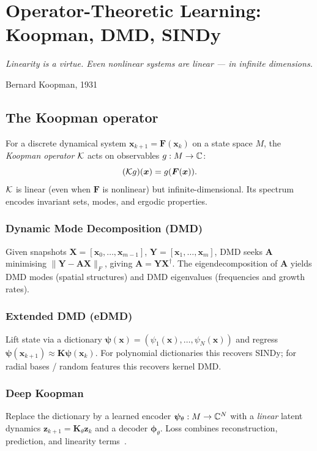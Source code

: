\chapter{Operator-Theoretic Learning: Koopman, DMD, SINDy}
\label{ch:operator-theoretic}

\epigraph{\itshape Linearity is a virtue. Even nonlinear systems are
linear --- in infinite dimensions.}{Bernard Koopman, 1931}

\section{The Koopman operator}
For a discrete dynamical system $\bm{x}_{k+1}=\bm{F}(\bm{x}_k)$ on a
state space $M$, the \emph{Koopman operator} $\mathcal{K}$ acts on observables
$g:M\to\mathbb{C}$:
\begin{equation}
(\mathcal{K} g)(\bm{x}) = g(\bm{F}(\bm{x})).
\end{equation}
$\mathcal{K}$ is linear (even when $\bm{F}$ is nonlinear) but
infinite-dimensional. Its spectrum encodes invariant sets, modes, and
ergodic properties.

\subsection{Dynamic Mode Decomposition (DMD)}
Given snapshots $\bm{X}=[\bm{x}_0,\dots,\bm{x}_{m-1}]$,
$\bm{Y}=[\bm{x}_1,\dots,\bm{x}_m]$, DMD seeks $\bm{A}$ minimising
$\|\bm{Y}-\bm{A}\bm{X}\|_F$, giving $\bm{A}=\bm{Y}\bm{X}^\dagger$.
The eigendecomposition of $\bm{A}$ yields DMD modes (spatial structures)
and DMD eigenvalues (frequencies and growth rates).

\subsection{Extended DMD (eDMD)}
Lift state via a dictionary
$\bm{\psi}(\bm{x})=(\psi_1(\bm{x}),\dots,\psi_N(\bm{x}))$ and
regress $\bm{\psi}(\bm{x}_{k+1})\approx \bm{K}\bm{\psi}(\bm{x}_k)$.
For polynomial dictionaries this recovers SINDy; for radial bases /
random features this recovers kernel DMD.

\subsection{Deep Koopman}
Replace the dictionary by a learned encoder
$\bm{\psi}_\theta:M\to\mathbb{C}^N$ with a \emph{linear} latent dynamics
$\bm{z}_{k+1}=\bm{K}_\theta\bm{z}_k$ and a decoder
$\bm{\phi}_\theta$. Loss combines reconstruction, prediction, and
linearity terms~\cite{lusch2018koopman}.

